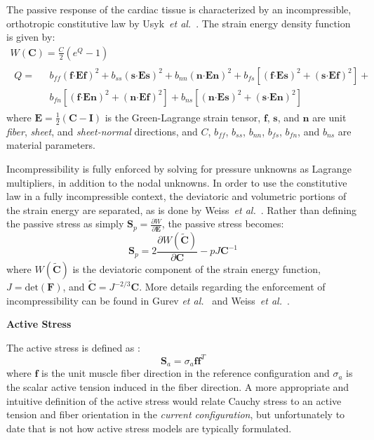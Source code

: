 The passive response of the cardiac tissue is characterized by an incompressible, orthotropic constitutive law by Usyk~\textit{et al.}~\cite{usyk_2002}. The strain energy density function is given by:
\begin{gather}
W(\bm{C}) = \frac{C}{2}\left(e^Q -1\right) \\
\begin{aligned}
Q =\text{\ } &b_{ff} \left(\bm{f}\bm{\cdot}\bm{E}\bm{f}\right)^2 + b_{ss} \left(\bm{s}\bm{\cdot}\bm{E}\bm{s}\right)^2 + b_{nn} \left(\bm{n}\bm{\cdot}\bm{E}\bm{n}\right)^2 + b_{fs}\left[\left(\bm{f}\bm{\cdot}\bm{E}\bm{s}\right)^2 + \left(\bm{s}\bm{\cdot}\bm{E}\bm{f}\right)^2\right] +\\
& b_{fn}\left[\left(\bm{f}\bm{\cdot}\bm{E}\bm{n}\right)^2 + \left(\bm{n}\bm{\cdot}\bm{E}\bm{f}\right)^2\right] + b_{ns}\left[\left(\bm{n}\bm{\cdot}\bm{E}\bm{s}\right)^2 + \left(\bm{s}\bm{\cdot}\bm{E}\bm{n}\right)^2\right]
\end{aligned}
\label{eqn:usyk}
\end{gather}
where $\bm{E} = \frac{1}{2}(\bm{C} - \bm{I})$ is the Green-Lagrange strain tensor, $\bm{f}$, $\bm{s}$, and $\bm{n}$ are unit \textit{fiber}, \textit{sheet}, and \textit{sheet-normal} directions, and $C$, $b_{ff}$, $b_{ss}$, $b_{nn}$, $b_{fs}$, $b_{fn}$, and $b_{ns}$ are material parameters.

Incompressibility is fully enforced by solving for pressure unknowns as Lagrange multipliers, in addition to the nodal unknowns. In order to use the constitutive law in a fully incompressible context, the deviatoric and volumetric portions of the strain energy are separated, as is done by Weiss~\textit{et al.}~\cite{weiss_1996}. Rather than defining the passive stress as simply $\bm{S}_p = \frac{\partial W}{\partial \bm{E}}$, the passive stress becomes:
\begin{equation}
\bm{S}_p= 2\frac{\partial{{W}(\tilde{\bm{C}})}}{\partial{\bm{C}}} - pJ\bm{C}^{-1}
\end{equation}
where ${W}(\tilde{\bm{C}})$ is the deviatoric component of the strain energy function, $J = \text{det}(\bm{F})$, and $\tilde{\bm{C}} = J^{-2/3}\bm{C}$. More details regarding the enforcement of incompressibility can be found in Gurev \textit{et al.}~\cite{gurev_2015} and Weiss~\textit{et al.}~\cite{weiss_1996}.

\textbf{Active Stress}

The active stress is defined as :
\begin{equation}
\bm{S}_a = \sigma_a \bm{f} \bm{f}^{T}
\label{eqn:active}
\end{equation}
where $\bm{f}$ is the unit muscle fiber direction in the reference configuration and ${\sigma_a}$ is the scalar active tension induced in the fiber direction. A more appropriate and intuitive definition of the active stress would relate Cauchy stress to an active tension and fiber orientation in the \textit{current configuration}, but unfortunately to date that is not how active stress models are typically formulated.


